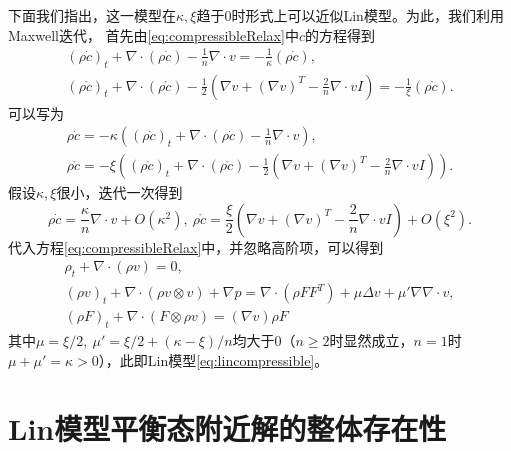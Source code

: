 下面我们指出，这一模型在$\kappa,\xi$趋于$0$时形式上可以近似Lin模型。为此，我们利用Maxwell迭代，
首先由\eqref{eq:compressibleRelax}中$c$的方程得到
\begin{eqnarray*}
    (\rho \dot{c})_t + \nabla \cdot (\rho \dot{c}) -  \frac{1}{n} \nabla \cdot v  = - \frac{1}{\kappa} (\rho  \dot{c}), \\
    (\rho \mathring{c})_t + \nabla \cdot (\rho \mathring{c}) -  \frac{1}{2} (\nabla v + (\nabla v)^T  - \frac{2}{n} \nabla \cdot v I)  = - \frac{1}{\xi} (\rho  \mathring{c}).
\end{eqnarray*}
可以写为
\begin{eqnarray*}
    \rho \dot{c} = - \kappa\left( (\rho \dot{c})_t + \nabla \cdot (\rho \dot{c}) - \frac{1}{n} \nabla \cdot v\right), \\
    \rho \mathring{c} = - \xi \left( (\rho \mathring{c})_t + \nabla \cdot (\rho \mathring{c}) -  \frac{1}{2} (\nabla v + (\nabla v)^T  - \frac{2}{n} \nabla \cdot v I) \right).
\end{eqnarray*}
假设$\kappa,\xi$很小，迭代一次得到
\begin{equation*}
    \rho \dot{c} = \frac{\kappa}{n} \nabla \cdot v + O(\kappa^2), \ \rho \mathring{c} =  \frac{\xi}{2} (\nabla v + (\nabla v)^T  - \frac{2}{n} \nabla \cdot v I) + O(\xi^2).
\end{equation*}
代入方程\eqref{eq:compressibleRelax}中，并忽略高阶项，可以得到
\begin{subequations}\label{eq:compressible}
  \begin{align}
  \rho_t + \nabla \cdot (\rho  v ) = 0, \\
  (\rho  v )_t + \nabla \cdot ( \rho  v  \otimes  v ) + \nabla p = \nabla \cdot (\rho F F^T) + \mu \Delta  v  + \mu' \nabla \nabla \cdot  v , \\
  (\rho F)_t + \nabla \cdot (F \otimes \rho  v ) = (\nabla  v ) \rho F
\end{align}
\end{subequations}
其中$\mu = \xi/2,\ \mu'=\xi/2 + (\kappa - \xi)/n$均大于$0$（$n\ge 2$时显然成立，$n=1$时$\mu + \mu' = \kappa>0$），此即Lin模型\eqref{eq:lincompressible}\cite{lin2005hydrodynamics,lei2008global}。

\section{Lin模型平衡态附近解的整体存在性}


